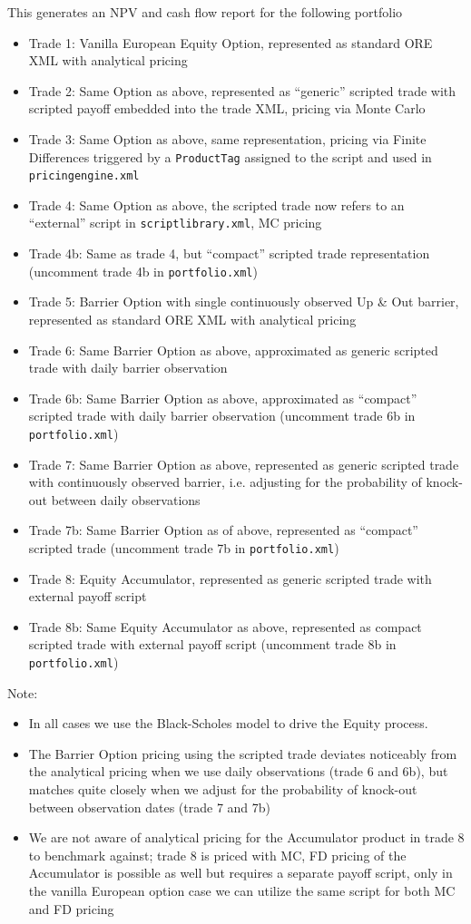 \documentclass[12pt, a4paper]{article}
\begin{document}
This generates an NPV and cash flow report for the following portfolio
\begin{itemize}
\item Trade 1: Vanilla European Equity Option, represented as standard ORE XML with analytical pricing
\item Trade 2: Same Option as above, represented as ``generic'' scripted trade with scripted payoff embedded into the trade XML,
  pricing via Monte Carlo
\item Trade 3: Same Option as above, same representation, pricing via Finite Differences triggered by a {\tt ProductTag} assigned
  to the script and used in {\tt pricingengine.xml} 
\item Trade 4: Same Option as above, the scripted trade now refers to an ``external'' script in {\tt scriptlibrary.xml},
  MC pricing
\item Trade 4b: Same as trade 4, but ``compact'' scripted trade representation (uncomment trade 4b in {\tt portfolio.xml})
\item Trade 5: Barrier Option with single continuously observed Up \& Out barrier, represented as standard ORE XML with
  analytical pricing
\item Trade 6: Same Barrier Option as above, approximated as generic scripted trade with daily barrier observation
\item Trade 6b: Same Barrier Option as above, approximated as ``compact'' scripted trade with daily barrier observation
  (uncomment trade 6b in {\tt portfolio.xml})
\item Trade 7: Same Barrier Option as above, represented as generic scripted trade with continuously observed barrier,
  i.e. adjusting for the probability of knock-out between daily observations
\item Trade 7b: Same Barrier Option as of above, represented as ``compact'' scripted trade
  (uncomment trade 7b in {\tt portfolio.xml})
\item Trade 8: Equity Accumulator, represented as generic scripted trade with external payoff script
\item Trade 8b: Same Equity Accumulator as above, represented as compact scripted trade with external payoff script
  (uncomment trade 8b in {\tt portfolio.xml})
\end{itemize}

Note:
\begin{itemize}
\item In all cases we use the Black-Scholes model to drive the Equity process.
\item The Barrier Option pricing using the scripted trade deviates noticeably from the analytical pricing when we use daily
  observations (trade 6 and 6b), but matches quite closely when we adjust for the probability of knock-out between observation
  dates (trade 7 and 7b)
\item We are not aware of analytical pricing for the Accumulator product in trade 8 to benchmark against; trade 8 is priced with MC,
  FD pricing of the Accumulator is possible as well but requires a separate payoff script, only in the vanilla European option case
  we can utilize the same script for both MC and FD pricing
\end{itemize}
\end{document}
